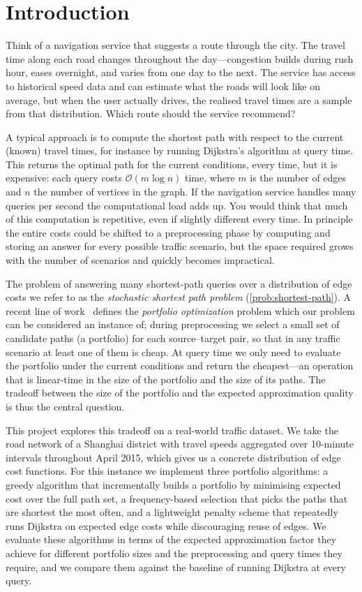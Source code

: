 \section{Introduction}
\label{sec:intro}

Think of a navigation service that suggests a route through the city. The travel time along each road changes throughout the day---congestion builds during rush hour, eases overnight, and varies from one day to the next. The service has access to historical speed data and can estimate what the roads will look like on average, but when the user actually drives, the realised travel times are a sample from that distribution. Which route should the service recommend?

A typical approach is to compute the shortest path with respect to the current (known) travel times, for instance by running Dijkstra's algorithm at query time. This returns the optimal path for the current conditions, every time, but it is expensive: each query costs $\mathcal O(m \log n)$ time, where $m$ is the number of edges and $n$ the number of vertices in the graph. If the navigation service handles many queries per second the computational load adds up. You would think that much of this computation is repetitive, even if slightly different every time. In principle the entire costs could be shifted to a preprocessing phase by computing and storing an answer for every possible traffic scenario, but the space required grows with the number of scenarios and quickly becomes impractical.

The problem of answering many shortest-path queries over a distribution of edge costs we refer to as the \emph{stochastic shortest path problem} (\cref{prob:shortest-path}). A recent line of work~\cite{miltos} defines the \emph{portfolio optimization} problem which our problem can be considered an instance of; during preprocessing we select a small set of candidate paths (a portfolio) for each source--target pair, so that in any traffic scenario at least one of them is cheap. At query time we only need to evaluate the portfolio under the current conditions and return the cheapest---an operation that is linear-time in the size of the portfolio and the size of its paths. The tradeoff between the size of the portfolio and the expected approximation quality is thus the central question.

This project explores this tradeoff on a real-world traffic dataset. We take the road network of a Shanghai district with travel speeds aggregated over 10-minute intervals throughout April 2015, which gives us a concrete distribution of edge cost functions. For this instance we implement three portfolio algorithms: a greedy algorithm that incrementally builds a portfolio by minimising expected cost over the full path set, a frequency-based selection that picks the paths that are shortest the most often, and a lightweight penalty scheme that repeatedly runs Dijkstra on expected edge costs while discouraging reuse of edges. We evaluate these algorithms in terms of the expected approximation factor they achieve for different portfolio sizes and the preprocessing and query times they require, and we compare them against the baseline of running Dijkstra at every query.

